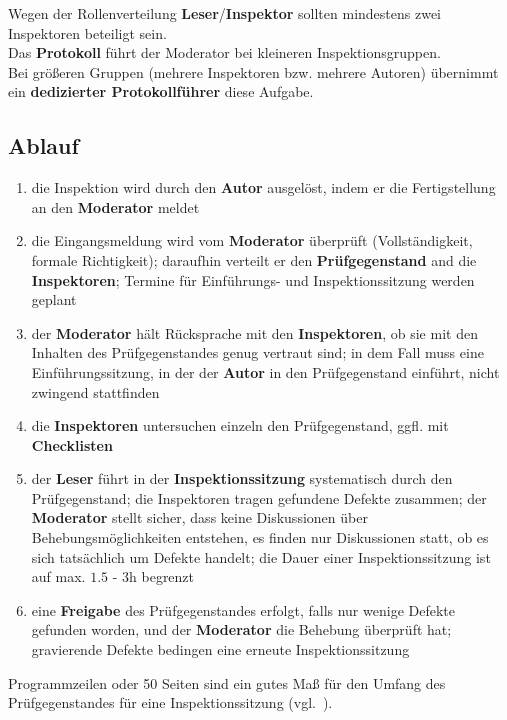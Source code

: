 \noindent
Wegen der Rollenverteilung \textbf{Leser}/\textbf{Inspektor} sollten mindestens zwei Inspektoren beteiligt sein.\\

\noindent
Das \textbf{Protokoll} führt der Moderator bei kleineren Inspektionsgruppen.\\
Bei größeren Gruppen (mehrere Inspektoren bzw. mehrere Autoren) übernimmt ein \textbf{dedizierter Protokollführer} diese Aufgabe.

\subsection{Ablauf}

\begin{enumerate}
    \item die Inspektion wird durch den \textbf{Autor} ausgelöst, indem er die Fertigstellung an den \textbf{Moderator} meldet
    \item die Eingangsmeldung wird vom \textbf{Moderator} überprüft (Vollständigkeit, formale Richtigkeit); daraufhin verteilt er den \textbf{Prüfgegenstand} and die \textbf{Inspektoren}; Termine für Einführungs- und Inspektionssitzung werden geplant
    \item der \textbf{Moderator} hält Rücksprache mit den \textbf{Inspektoren}, ob sie mit den Inhalten des Prüfgegenstandes genug vertraut sind; in dem Fall muss eine Einführungssitzung, in der der \textbf{Autor} in den Prüfgegenstand einführt, nicht zwingend stattfinden
    \item die \textbf{Inspektoren} untersuchen einzeln den Prüfgegenstand, ggfl. mit \textbf{Checklisten}
    \item der \textbf{Leser} führt in der \textbf{Inspektionssitzung} systematisch durch den Prüfgegenstand; die Inspektoren tragen gefundene Defekte zusammen; der \textbf{Moderator} stellt sicher, dass keine Diskussionen über Behebungsmöglichkeiten entstehen, es finden nur Diskussionen statt, ob  es sich tatsächlich um Defekte handelt; die Dauer einer Inspektionssitzung ist auf max. $1.5$ - $3$h begrenzt
    \item eine \textbf{Freigabe} des Prüfgegenstandes erfolgt, falls nur wenige Defekte gefunden worden, und der \textbf{Moderator} die Behebung überprüft hat; gravierende Defekte bedingen eine erneute Inspektionssitzung
\end{enumerate}

 Programmzeilen oder 50 Seiten sind ein gutes Maß für den Umfang des Prüfgegenstandes für eine Inspektionssitzung (vgl.~\cite[20]{Wed09c}).\\

